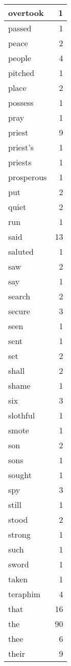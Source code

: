 \begin{center}
\begin{longtable}{l|r}
overtook & 1\\ \hline 
passed & 1\\ \hline 
peace & 2\\ \hline 
people & 4\\ \hline 
pitched & 1\\ \hline 
place & 2\\ \hline 
possess & 1\\ \hline 
pray & 1\\ \hline 
priest & 9\\ \hline 
priest's & 1\\ \hline 
priests & 1\\ \hline 
prosperous & 1\\ \hline 
put & 2\\ \hline 
quiet & 2\\ \hline 
run & 1\\ \hline 
said & 13\\ \hline 
saluted & 1\\ \hline 
saw & 2\\ \hline 
say & 1\\ \hline 
search & 2\\ \hline 
secure & 3\\ \hline 
seen & 1\\ \hline 
sent & 1\\ \hline 
set & 2\\ \hline 
shall & 2\\ \hline 
shame & 1\\ \hline 
six & 3\\ \hline 
slothful & 1\\ \hline 
smote & 1\\ \hline 
son & 2\\ \hline 
sons & 1\\ \hline 
sought & 1\\ \hline 
spy & 3\\ \hline 
still & 1\\ \hline 
stood & 2\\ \hline 
strong & 1\\ \hline 
such & 1\\ \hline 
sword & 1\\ \hline 
taken & 1\\ \hline 
teraphim & 4\\ \hline 
that & 16\\ \hline 
the & 90\\ \hline 
thee & 6\\ \hline 
their & 9\\ \hline 

\end{longtable}
\end{center}
